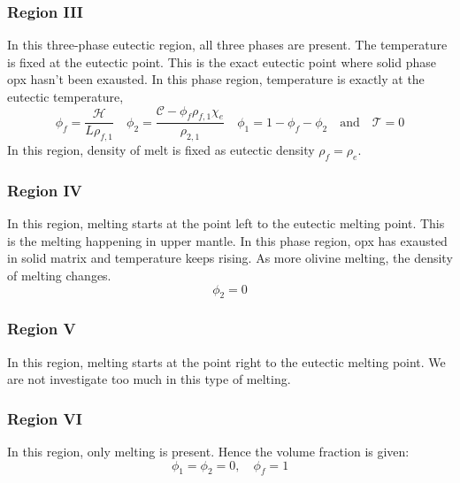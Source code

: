\subsubsection{Region III}
In this three-phase eutectic region, all three phases are present.
The temperature is fixed at the eutectic point.
This is the exact eutectic point where solid phase opx hasn't been 
exausted.
In this phase region, temperature is exactly at the eutectic temperature,
\begin{equation}
\phi_f = \frac{\mathcal{H}}{L\rho_{f,1}} \quad \phi_2 = \frac{\mathcal{C} - \phi_f\rho_{f,1}\chi_e}{\rho_{2,1}} \quad \phi_1 = 1-\phi_f - \phi_2 \quad \text{and} \quad \mathcal{T} = 0
\end{equation}
In this region, density of melt is fixed as eutectic density $\rho_f = \rho_e$.

\subsubsection{Region IV}
In this region, melting starts at the point left to the eutectic melting point.
This is the melting happening in upper mantle.
In this phase region, opx has exausted in solid matrix and temperature keeps rising.
As more olivine melting, the density of melting changes.
\begin{equation}
\phi_2 = 0
\end{equation}

\subsubsection{Region V}
In this region, melting starts at the point right to the eutectic melting point.
We are not investigate too much in this type of melting.

\subsubsection{Region VI}
In this region, only melting is present.
Hence the volume fraction is given:
\begin{equation}
\phi_{1} = \phi_{2} = 0, \quad \phi_{f} = 1
\end{equation}



